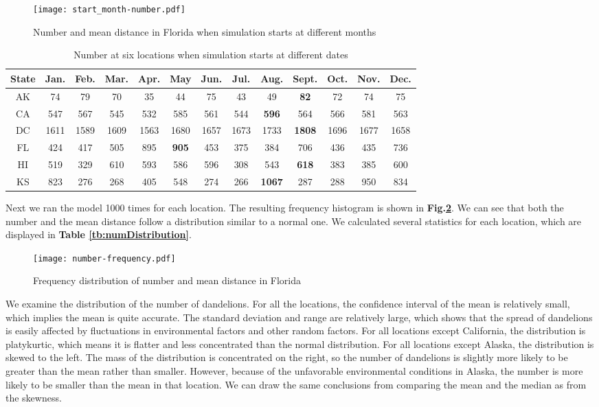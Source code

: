 \documentclass[12pt]{article}
\begin{document}
			\begin{figure}[htbp]
				\centering
				\texttt{[image: start\_month-number.pdf]}
				\caption{Number and mean distance in Florida when simulation starts at different months}
				\label{fig:start}
			\end{figure}
			
			{
				\fontsize{10}{14}\selectfont
				{
					\begin{longtable}{ccccccccccccc}
						\caption{Number at six locations when simulation starts at different dates}
						\label{tb:start}\\
						\toprule
						State&Jan.&Feb.&Mar.&Apr.&May&Jun.&Jul.&Aug.&Sept.&Oct.&Nov.&Dec.\\
						\toprule
						AK&74&79&70&35&44&75&43&49&\color{blue}\textbf{82}&72&74&75\\
						CA&547&567&545&532&585&561&544&\color{blue}\textbf{596}&564&566&581&563\\
						DC&1611&1589&1609&1563&1680&1657&1673&1733&\color{blue}\textbf{1808}&1696&1677&1658\\
						FL&424&417&505&895&\color{blue}\textbf{905}&453&375&384&706&436&435&736\\
						HI&519&329&610&593&586&596&308&543&\color{blue}\textbf{618}&383&385&600\\
						KS&823&276&268&405&548&274&266&\color{blue}\textbf{1067}&287&288&950&834\\
						\bottomrule
					\end{longtable}
				}
			}
			
			Next we ran the model 1000 times for each location.  The resulting frequency histogram is shown in \textbf{Fig.\ref{fig:freqDand}}.  We can see that both the number and the mean distance follow a distribution similar to a normal one.  We calculated several statistics for each location, which are displayed in \textbf{Table \ref{tb:numDistribution}}.
			
			\begin{figure}[htbp]
				\centering
				\texttt{[image: number-frequency.pdf]}
				\caption{Frequency distribution of number and mean distance in Florida}
				\label{fig:freqDand}
			\end{figure}
			
			We examine the distribution of the number of dandelions.  For all the locations, the confidence interval of the mean is relatively small, which implies the mean is quite accurate.  The standard deviation and range are relatively large, which shows that the spread of dandelions is easily affected by fluctuations in environmental factors and other random factors.  For all locations except California, the distribution is platykurtic, which means it is flatter and less concentrated than the normal distribution.  For all locations except Alaska, the distribution is skewed to the left.  The mass of the distribution is concentrated on the right, so the number of dandelions is slightly more likely to be greater than the mean rather than smaller.  However, because of the unfavorable environmental conditions in Alaska, the number is more likely to be smaller than the mean in that location.  We can draw the same conclusions from comparing the mean and the median as from the skewness.
			
\end{document}
